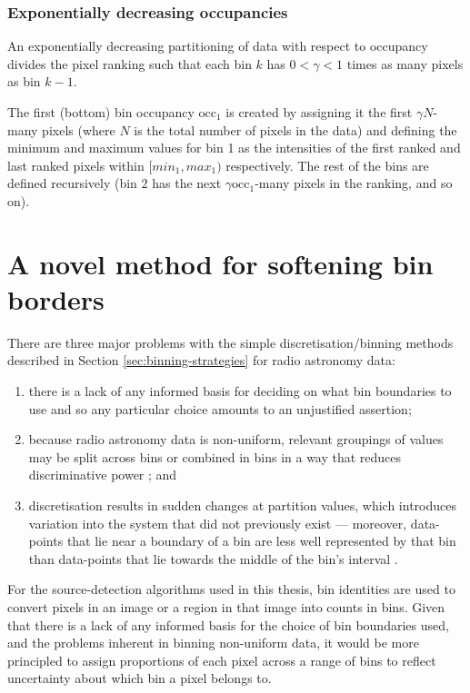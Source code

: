 \subsubsection{Exponentially decreasing occupancies}
An exponentially decreasing partitioning of data with respect to occupancy divides the pixel ranking such that each bin $k$ has $0 < \gamma < 1$ times as many pixels as bin $k-1$. 

The first (bottom) bin occupancy $\text{occ}_1$ is created by assigning it the first $\gamma N$-many pixels (where $N$ is the total number of pixels in the data) and defining the minimum and maximum values for bin 1 as the intensities of the first ranked and last ranked pixels within $[min_1, max_1)$ respectively. The rest of the bins are defined recursively (bin $2$ has the next $\gamma \text{occ}_1$-many pixels in the ranking, and so on).

\section{A novel method for softening bin borders}\label{sec:dirichlet-borders}

There are three major problems with the simple discretisation/binning methods described in Section \ref{sec:binning-strategies} for radio astronomy data:
\begin{enumerate}
\item there is a lack of any informed basis for deciding on what bin boundaries to use and so any particular choice amounts to an unjustified assertion; 
\item because radio astronomy data is non-uniform, relevant groupings of values may be split across bins or combined in bins in a way that reduces discriminative power \cite{clarke2000entropy}; and
\item discretisation results in sudden changes at partition values, which introduces variation into the system that did not previously exist --- moreover, data-points that lie near a boundary of a bin are less well represented by that bin than data-points that lie towards the middle of the bin's interval \cite{yang2002non}.
\end{enumerate}

For the source-detection algorithms used in this thesis, bin identities are used to convert pixels in an image or a region in that image into counts in bins. Given that there is a lack of any informed basis for the choice of bin boundaries used, and the problems inherent in binning non-uniform data, it would be more principled to assign proportions of each pixel across a range of bins to reflect uncertainty about which bin a pixel belongs to.

